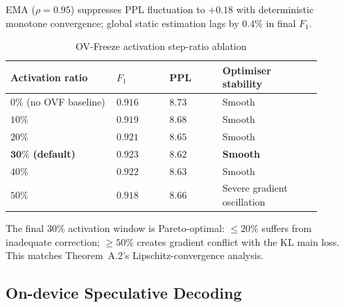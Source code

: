 \documentclass[11pt, a4paper]{article}
\begin{document}
EMA ($\rho = 0.95$) suppresses PPL fluctuation to $+0.18$ with deterministic monotone convergence; global static estimation lags by $0.4\%$ in final $F_1$.

\begin{table}[htbp]
\centering
\caption{OV-Freeze activation step-ratio ablation}
\label{tab9-en}
\small
\renewcommand{\arraystretch}{1.15}
\begin{tabular}{>{\raggedright\arraybackslash}p{0.3\linewidth}>{\centering\arraybackslash}p{0.15\linewidth}>{\centering\arraybackslash}p{0.15\linewidth}>{\centering\arraybackslash}p{0.29\linewidth}}
\toprule
\textbf{Activation ratio} & \textbf{$F_1$} & \textbf{PPL} & \textbf{Optimiser stability} \\
\midrule
$0\%$ (no OVF baseline) & $0.916$ & $8.73$ & Smooth \\
$10\%$ & $0.919$ & $8.68$ & Smooth \\
$20\%$ & $0.921$ & $8.65$ & Smooth \\
$\mathbf{30\%}$ \textbf{(default)} & $\mathbf{0.923}$ & $\mathbf{8.62}$ & \textbf{Smooth} \\
$40\%$ & $0.922$ & $8.63$ & Smooth \\
$50\%$ & $0.918$ & $8.66$ & Severe gradient oscillation \\
\bottomrule
\end{tabular}
\end{table}

The final 30\% activation window is Pareto-optimal: $\le 20\%$ suffers from inadequate correction; $\ge 50\%$ creates gradient conflict with the KL main loss. This matches Theorem~A.2's Lipschitz-convergence analysis.

\subsection{On-device Speculative Decoding}
\end{document}
